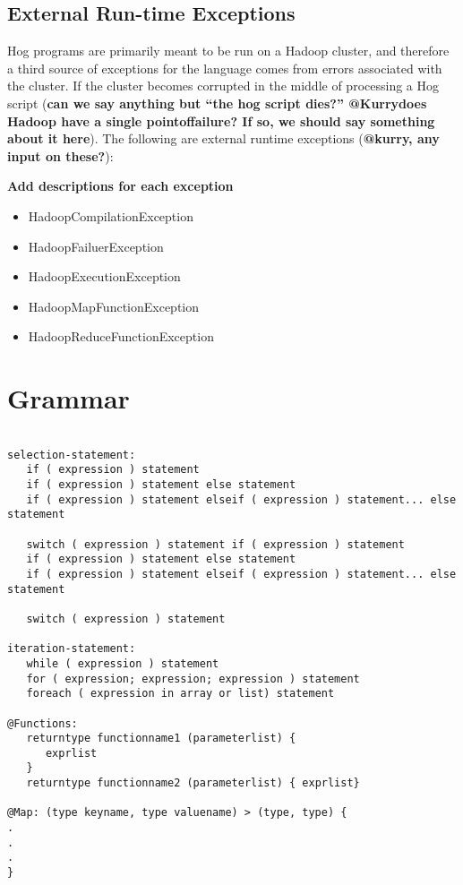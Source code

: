 \documentclass{book}
\begin{document}
\section{External Run-time Exceptions} %
\label{sec:external_run_time_exceptions}

Hog programs are primarily meant to be run on a Hadoop cluster, and therefore a
third source of exceptions for the language comes from errors associated with the
cluster. If the cluster becomes corrupted in the middle of processing a Hog script
(\textbf{can we say anything but ``the hog script dies?'' @Kurry­­­does Hadoop
have a single point­of­failure? If so, we should say something about it here}).
The following are external run­time exceptions (\textbf{@kurry, any input on
these?}):

\textbf{Add descriptions for each exception}

\begin{itemize}
  \item[] HadoopCompilationException
  \item[] HadoopFailuerException
  \item[] HadoopExecutionException
  \item[] HadoopMapFunctionException
  \item[] HadoopReduceFunctionException
\end{itemize}



\chapter{Grammar} %
\label{cha:grammar}

\begin{verbatim}

selection-statement:
   if ( expression ) statement
   if ( expression ) statement else statement
   if ( expression ) statement elseif ( expression ) statement... else statement

   switch ( expression ) statement if ( expression ) statement
   if ( expression ) statement else statement
   if ( expression ) statement elseif ( expression ) statement... else statement
 
   switch ( expression ) statement

iteration-statement:  
   while ( expression ) statement
   for ( expression; expression; expression ) statement
   foreach ( expression in array or list) statement

@Functions:
   return­type function­name­1 (parameter­list) {
      exprlist 
   }
   return­type function­name­2 (parameter­list) { exprlist}

@Map: (type key­name, type value­name) ­> (type, type) {
.
.
.
}


\end{verbatim}

\end{document}
